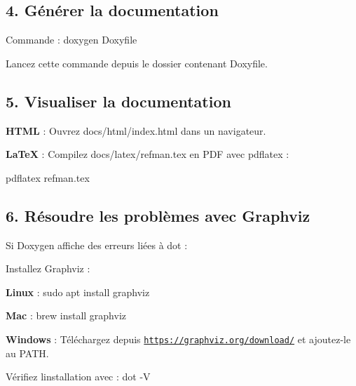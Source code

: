 \subsection*{4. Générer la documentation}


\begin{DoxyItemize}
\item Commande \+: {\ttfamily doxygen Doxyfile}
\item Lancez cette commande depuis le dossier contenant {\ttfamily Doxyfile}.
\end{DoxyItemize}

\subsection*{5. Visualiser la documentation}


\begin{DoxyItemize}
\item {\bfseries H\+T\+ML} \+: Ouvrez {\ttfamily docs/html/index.\+html} dans un navigateur.
\item {\bfseries La\+TeX} \+: Compilez {\ttfamily docs/latex/refman.\+tex} en P\+DF avec {\ttfamily pdflatex} \+: 
\begin{DoxyCode}
pdflatex refman.tex
\end{DoxyCode}

\end{DoxyItemize}

\subsection*{6. Résoudre les problèmes avec Graphviz}


\begin{DoxyItemize}
\item Si Doxygen affiche des erreurs liées à {\ttfamily dot} \+:
\begin{DoxyItemize}
\item Installez Graphviz \+:
\begin{DoxyItemize}
\item {\bfseries Linux} \+: {\ttfamily sudo apt install graphviz}
\item {\bfseries Mac} \+: {\ttfamily brew install graphviz}
\item {\bfseries Windows} \+: Téléchargez depuis \href{https://graphviz.org/download/}{\tt https\+://graphviz.\+org/download/} et ajoutez-\/le au {\ttfamily P\+A\+TH}.
\end{DoxyItemize}
\item Vérifiez l\textquotesingle{}installation avec \+: {\ttfamily dot -\/V} 

 
\end{DoxyItemize}
\end{DoxyItemize}